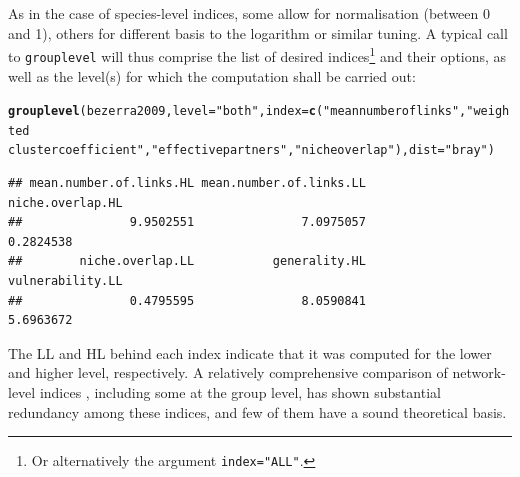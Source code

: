 \documentclass[a4paper, 11pt]{article}\usepackage[]{graphicx}\usepackage[]{color}
\makeatletter
\newcommand{\hlstr}[1]{\textcolor[rgb]{0.192,0.494,0.8}{#1}}%
\newcommand{\hlstd}[1]{\textcolor[rgb]{0.345,0.345,0.345}{#1}}%
\newcommand{\hlkwc}[1]{\textcolor[rgb]{0.333,0.667,0.333}{#1}}%
\newcommand{\hlkwd}[1]{\textcolor[rgb]{0.737,0.353,0.396}{\textbf{#1}}}%
\newenvironment{kframe}{%
 \def\at@end@of@kframe{}%
 \ifinner\ifhmode%
  \def\at@end@of@kframe{\end{minipage}}%
  \begin{minipage}{\columnwidth}%
 \fi\fi%
 \def\FrameCommand##1{\hskip\@totalleftmargin \hskip-\fboxsep
 \colorbox{shadecolor}{##1}\hskip-\fboxsep
     \hskip-\linewidth \hskip-\@totalleftmargin \hskip\columnwidth}%
 \MakeFramed {\advance\hsize-\width
   \@totalleftmargin\z@ \linewidth\hsize
   \@setminipage}}%
 {\par\unskip\endMakeFramed%
 \at@end@of@kframe}
\newenvironment{knitrout}{}{} %
\makeatother
\begin{document}
\noindent As in the case of species-level indices, some allow for normalisation (between 0 and 1), others for different basis to the logarithm or similar tuning. A typical call to \texttt{grouplevel} will thus comprise the list of desired indices\footnote{Or alternatively the argument \texttt{index="ALL"}.} and their options, as well as the level(s) for which the computation shall be carried out:
\begin{knitrout}
\color{fgcolor}\begin{kframe}
\begin{alltt}
\hlkwd{grouplevel}\hlstd{(bezerra2009,} \hlkwc{level}\hlstd{=}\hlstr{"both"}\hlstd{,} \hlkwc{index}\hlstd{=}\hlkwd{c}\hlstd{(}\hlstr{"mean number of links"}\hlstd{,} \hlstr{"weighted 
     cluster coefficient"}\hlstd{,} \hlstr{"effective partners"}\hlstd{,} \hlstr{"niche overlap"}\hlstd{),} \hlkwc{dist}\hlstd{=}\hlstr{"bray"}\hlstd{)}
\end{alltt}
\begin{verbatim}
## mean.number.of.links.HL mean.number.of.links.LL        niche.overlap.HL 
##               9.9502551               7.0975057               0.2824538 
##        niche.overlap.LL           generality.HL        vulnerability.LL 
##               0.4795595               8.0590841               5.6963672
\end{verbatim}
\end{kframe}
\end{knitrout}
The LL and HL behind each index indicate that it was computed for the lower and higher level, respectively. A relatively comprehensive comparison of network-level indices \citep{Dormann2009}, including some at the group level, has shown substantial redundancy among these indices, and few of them have a sound theoretical basis.
\end{document}
